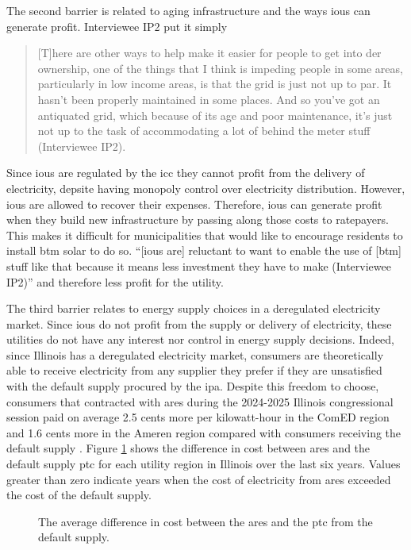 The second barrier is related to aging infrastructure and the ways \acp{iou} can
generate profit. Interviewee IP2 put it simply
\begin{quote}
     [T]here are other ways to help make it easier for people to get into
     \acs{der} ownership, one of the things that I think is impeding people in
     some areas, particularly in low income areas, is that the grid is just not
     up to par. It hasn't been properly maintained in some places. And so you've
     got an antiquated grid, which because of its age and poor maintenance, it's
     just not up to the task of accommodating a lot of behind the meter stuff
     (Interviewee IP2).
\end{quote}
Since \acfp{iou} are regulated by the \ac{icc} they cannot profit from the
delivery of electricity, depsite having monopoly control over electricity
distribution. However, \acp{iou} are allowed to recover their expenses.
Therefore, \acp{iou} can generate profit when they build new infrastructure by
passing along those costs to ratepayers. This makes it difficult for
municipalities that would like to encourage residents to install \ac{btm} solar
to do so. ``[\acp{iou} are] reluctant to want to enable the use of [\ac{btm}]
stuff like that because it means less investment they have to make (Interviewee
IP2)'' and therefore less profit for the utility.

The third barrier relates to energy supply choices in a deregulated electricity
market. Since \acp{iou} do not profit from the supply or delivery of
electricity, these utilities do not have any interest nor control in energy
supply decisions. Indeed, since Illinois has a deregulated electricity market,
consumers are theoretically able to receive electricity from any supplier they
prefer if they are unsatisfied with the default supply procured by the \ac{ipa}.
Despite this freedom to choose, consumers that contracted with \ac{ares} during
the 2024-2025 Illinois congressional session paid on average 2.5 cents more per
kilowatt-hour in the ComED region and 1.6 cents more in the Ameren region
compared with consumers receiving the default supply
\cite{office_of_retail_market_development_2025_2025}. Figure \ref{fig:ares-ptc}
shows the difference in cost between \ac{ares} and the default supply \ac{ptc}
for each utility region in Illinois over the last six years. Values greater than
zero indicate years when the cost of electricity from \ac{ares} exceeded the
cost of the default supply.

\begin{figure}[ht!]
    \centering
    \resizebox{0.9\columnwidth}{!}{}
    \caption{The average difference in cost between the \ac{ares} and the
    \ac{ptc} from the default supply.}
    \label{fig:ares-ptc}
\end{figure}

